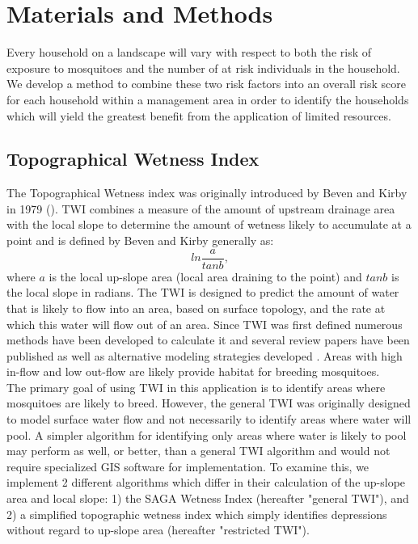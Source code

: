 \documentclass[10pt,letterpaper]{article}\usepackage[]{graphicx}\usepackage[]{color}
\begin{document}
\section*{Materials and Methods}%
Every household on a landscape will vary with respect to both the risk of exposure to mosquitoes and the number of at risk individuals in the household. We develop a method to combine these two risk factors into an overall risk score for each household within a management area in order to identify the households which will yield the greatest benefit from the application of limited resources.\\

\subsection{Topographical Wetness Index}

The Topographical Wetness index was originally introduced by Beven and Kirby in 1979 (\cite{Beven1979}).  TWI combines a measure of the amount of upstream drainage area with the local slope to determine the amount of wetness likely to accumulate at a point and is defined by Beven and Kirby generally as:
$$ln\frac{a}{tanb},$$
where $a$ is the local up-slope area (local area draining to the point) and $tanb$ is the local slope in radians.  The TWI is designed to predict the amount of water that is likely to flow into an area, based on surface topology, and the rate at which this water will flow out of an area.  Since TWI was first defined numerous methods have been developed to calculate it and several review papers have been published \cite{Quinn1995, Sorensen2006} as well as alternative modeling strategies developed \cite{Grabs2009}.  Areas with high in-flow and low out-flow are likely provide habitat for breeding mosquitoes. \\

The primary goal of using TWI in this application is to identify areas where mosquitoes are likely to breed.  However, the general TWI was originally designed to model surface water flow and not necessarily to identify areas where water will pool. A simpler algorithm for identifying only areas where water is likely to pool may perform as well, or better, than a general TWI algorithm and would not require specialized GIS software for implementation.  To examine this, we implement 2 different algorithms which differ in their calculation of the up-slope area and local slope: 1) the SAGA Wetness Index \cite{Bohner2002} (hereafter "general TWI"), and 2) a simplified topographic wetness index which simply identifies depressions without regard to up-slope area (hereafter "restricted TWI").  \\
\end{document}
